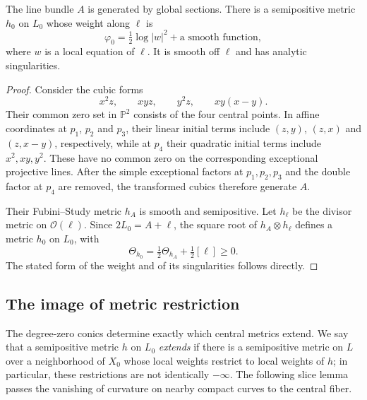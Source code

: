 \begin{lemma}\label{lem:four-point-central-semipositive-metric}
The line bundle $A$ is generated by global sections. There is a semipositive metric $h_0$ on $L_0$ whose weight along $\ell$ is
\[
 \varphi_0=\tfrac12\log|w|^2+\text{a smooth function},
\]
where $w$ is a local equation of $\ell$. It is smooth off $\ell$ and has analytic singularities.
\end{lemma}
\begin{proof}
Consider the cubic forms
\[
 x^2z,\qquad xyz,\qquad y^2z,\qquad xy(x-y).
\]
Their common zero set in $\mathbb P^2$ consists of the four central points. In affine coordinates at $p_1$, $p_2$ and $p_3$, their linear initial terms include $(z,y)$, $(z,x)$ and $(z,x-y)$, respectively, while at $p_4$ their quadratic initial terms include $x^2,xy,y^2$. These have no common zero on the corresponding exceptional projective lines. After the simple exceptional factors at $p_1,p_2,p_3$ and the double factor at $p_4$ are removed, the transformed cubics therefore generate $A$.

Their Fubini--Study metric $h_A$ is smooth and semipositive. Let $h_\ell$ be the divisor metric on $\mathcal O(\ell)$. Since $2L_0=A+\ell$, the square root of $h_A\otimes h_\ell$ defines a metric $h_0$ on $L_0$, with
\[
 \Theta_{h_0}=\tfrac12\Theta_{h_A}+\tfrac12[\ell]\geq0.
\]
The stated form of the weight and of its singularities follows directly.
\end{proof}

\subsection{The image of metric restriction}
\label{subsec:four-point-metric-restriction-image}

The degree-zero conics determine exactly which central metrics extend. We say that a semipositive metric $h$ on $L_0$ \emph{extends} if there is a semipositive metric on $L$ over a neighborhood of $X_0$ whose local weights restrict to local weights of $h$; in particular, these restrictions are not identically $-\infty$. The following slice lemma passes the vanishing of curvature on nearby compact curves to the central fiber.

